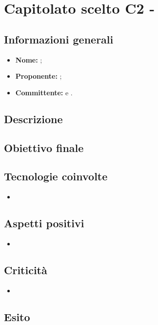 \section{Capitolato scelto C2 - \NomeProgetto}

\subsection{Informazioni generali}
	\begin{itemize}
		\item \textbf{Nome: } \NomeProgetto{}; 
		\item \textbf{Proponente: } \Proponente;
		\item \textbf{Committente: } \TV{} e \RC{}. 
	\end{itemize}

\subsection{Descrizione}

\subsection{Obiettivo finale}

\subsection{Tecnologie coinvolte}
	\begin{itemize}
		\item 
	\end{itemize}

\subsection{Aspetti positivi}
	\begin{itemize}
		\item 
	\end{itemize}

\subsection{Criticità}
	\begin{itemize}
		\item 
	\end{itemize}

\subsection{Esito}